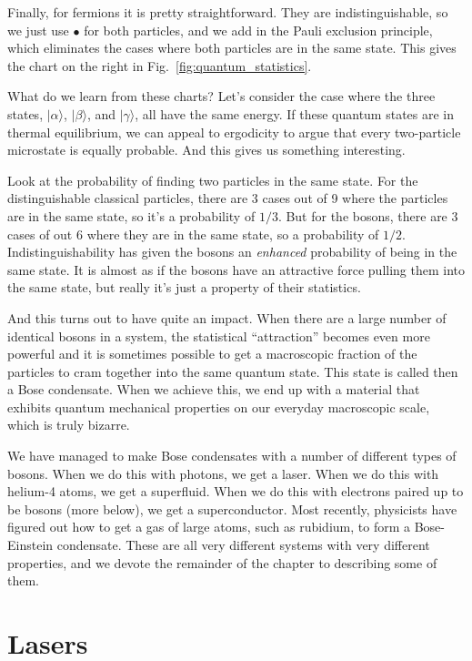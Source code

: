 Finally, for fermions it is pretty straightforward.  They are
indistinguishable, so we just use $\bullet$ for both particles, and we
add in the Pauli exclusion principle, which eliminates the cases where
both particles are in the same state.  This gives the chart on the
right in Fig.~\ref{fig:quantum_statistics}.

What do we learn from these charts?  Let's consider the case where the
three states, $|\alpha\rangle$, $|\beta\rangle$, and $|\gamma\rangle$,
all have the same energy.  If these quantum states are in thermal
equilibrium, we can appeal to ergodicity to argue that every
two-particle microstate is equally probable.  And this gives us
something interesting.

Look at the probability of finding two particles in the same state.
For the distinguishable classical particles, there are 3 cases out of
9 where the particles are in the same state, so it's a probability of
$1/3$.  But for the bosons, there are 3 cases of out 6 where they are
in the same state, so a probability of $1/2$.  Indistinguishability
has given the bosons an \textit{enhanced} probability of being in the
same state.  It is almost as if the bosons have an attractive force
pulling them into the same state, but really it's just a property of
their statistics.

And this turns out to have quite an impact.  When there are a large
number of identical bosons in a system, the statistical ``attraction''
becomes even more powerful and it is sometimes possible to get a
macroscopic fraction of the particles to cram together into the same
quantum state.  This state is called then a Bose condensate.  When we
achieve this, we end up with a material that exhibits quantum
mechanical properties on our everyday macroscopic scale, which is
truly bizarre.

We have managed to make Bose condensates with a number of different
types of bosons.  When we do this with photons, we get a laser.  When we
do this with helium-4 atoms, we get a superfluid.  When we do this with
electrons paired up to be bosons (more below), we get a superconductor.
Most recently, physicists have figured out how to get a gas of large atoms,
such as rubidium, to form a Bose-Einstein condensate.  These are all very
different systems with very different properties, and we devote the remainder
of the chapter to describing some of them.

\section{Lasers}
\label{sec:lasers}

